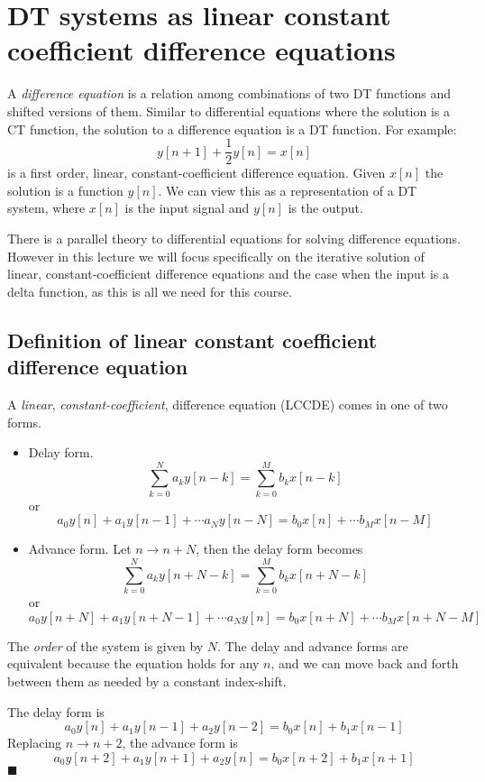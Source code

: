 \chapter{DT systems as linear constant coefficient difference equations}

A \emph{difference equation} is a relation among combinations of two DT functions and shifted versions of them. Similar to differential equations where the solution is a CT function, the solution to a difference equation is a DT function. For example:
\[                         
y[n+1] + \frac{1}{2}y[n] = x[n] 
\]
is a first order, linear, constant-coefficient difference equation. Given $x[n]$ the solution is a function $y[n]$. We can view this as a representation of a DT system, where $x[n]$ is the input signal and $y[n]$ is the output.

There is a parallel theory to differential equations for solving difference equations. However in this lecture we will focus specifically on the iterative solution of linear, constant-coefficient difference equations and the case when the input is a delta function, as this is all we need for this course.

\section{Definition of linear constant coefficient difference equation}

A \emph{linear}, \emph{constant-coefficient}, difference equation (LCCDE) comes in one of two forms.

\begin{itemize}
  \item Delay form. 
  \[    
  \sum\limits_{k = 0}^N a_k y[n-k] = \sum\limits_{k = 0}^M b_k x[n-k]
  \]
  or
  \[
  a_0y[n] + a_1y[n-1] + \cdots a_N y[n-N] = b_0 x[n] + \cdots b_Mx[n-M]
  \]
  
\item Advance form. Let $n\rightarrow n+N$, then the delay form becomes
  \[    
  \sum\limits_{k = 0}^N a_k y[n+N-k] = \sum\limits_{k = 0}^M b_k x[n+N-k]
  \]
  or 
  \[
  a_0y[n+N] + a_1y[n+N-1] + \cdots a_N y[n] = b_0 x[n+N] + \cdots b_Mx[n+N-M]
  \]
\end{itemize}

The {\it order} of the system is given by $N$. The delay and advance forms are equivalent because the equation holds for any $n$, and we can move back and forth between them as needed by a constant index-shift.

\begin{example}[$N=2$, $M=1$]
  The delay form is
  \[
  a_0y[n] + a_1 y[n-1] + a_2 y[n-2] = b_0 x[n] + b_1 x[n-1]
  \]
  Replacing $n \rightarrow n+2$, the advance form is
  \[
  a_0 y[n+2] + a_1 y[n+1] + a_2 y[n] = b_0 x[n+2] + b_1 x[n+1]
  \]
  $\blacksquare$
\end{example}

